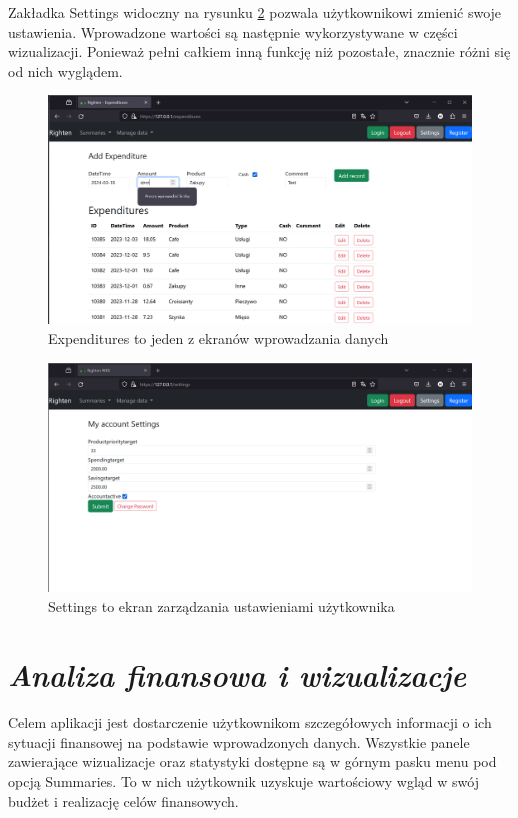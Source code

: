 \documentclass[a4paper, 10pt, twoside, openright]{report}
\newcommand{\customstylesection}[1]{\textbf{\textit{#1}}}
\begin{document}
\begin{large}
{Zakładka Settings widoczny na rysunku \ref{fig:usage_user-settings} pozwala 
użytkownikowi zmienić swoje ustawienia. Wprowadzone wartości są następnie 
wykorzystywane w części wizualizacji. Ponieważ pełni całkiem inną funkcję niż 
pozostałe, znacznie różni się od nich wyglądem.}

\begin{figure}[H]           %
    \centering
    \includegraphics[width=12cm]{figures/Righten_usage_example_data-management.png}
    \caption{Expenditures to jeden z ekranów wprowadzania danych}
    \label{fig:usage_data-management}
\end{figure}

\begin{figure}[H]           %
    \centering
    \includegraphics[width=12cm]{figures/Righten_usage_example_user-settings.png}
    \caption{Settings to ekran zarządzania ustawieniami użytkownika}
    \label{fig:usage_user-settings}
\end{figure}

\section{\customstylesection{Analiza finansowa i wizualizacje}}
{Celem aplikacji jest dostarczenie użytkownikom szczegółowych informacji o ich 
sytuacji finansowej na podstawie wprowadzonych danych. Wszystkie panele 
zawierające wizualizacje oraz statystyki dostępne są w górnym pasku menu pod 
opcją Summaries. To w nich użytkownik uzyskuje wartościowy wgląd w swój budżet i
 realizację celów finansowych.}


\end{large}
\end{document}

